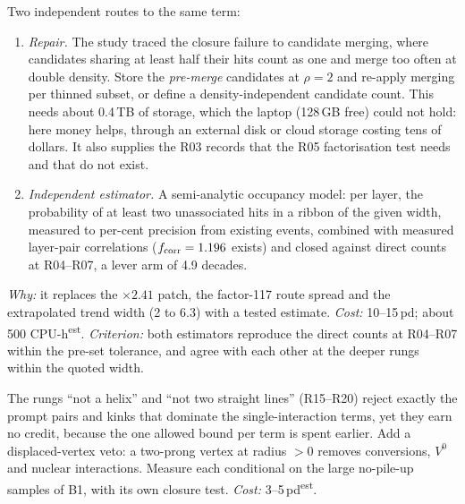 \documentclass[11pt,a4paper]{article}
\newcommand{\EST}{\textsuperscript{\textsf{est}}}
\newcommand{\must}{\textsf{\textbf{Must}}}
\begin{document}
\begin{description}[leftmargin=0pt,style=unboxed]
\item[B2 \must{} Pile-up: repair the thinning closure and add an independent estimator.]
  Two independent routes to the same term:
  \begin{enumerate}
    \item \emph{Repair.} The study traced the closure failure to candidate merging, where candidates sharing at least half
          their hits count as one and merge too often at double density. Store the \emph{pre-merge} candidates at
          $\rho=2$ and re-apply merging per thinned subset, or define a density-independent candidate count. This needs
          about 0.4\,TB of storage, which the laptop (128\,GB free) could not hold: here money helps, through an external
          disk or cloud storage costing tens of dollars. It also supplies the R03 records that the R05 factorisation test
          needs and that do not exist.
    \item \emph{Independent estimator.} A semi-analytic occupancy model: per layer, the probability of at least two
          unassociated hits in a ribbon of the given width, measured to per-cent precision from existing events, combined
          with measured layer-pair correlations ($f_{\rm corr}=1.196$ exists) and closed against direct counts at
          R04--R07, a lever arm of 4.9 decades.
  \end{enumerate}
  \emph{Why:} it replaces the $\times2.41$ patch, the factor-117 route spread and the extrapolated trend width
  (2 to 6.3) with a tested estimate. \emph{Cost:} 10--15\,pd; about 500 CPU-h\EST.
  \emph{Criterion:} both estimators reproduce the direct counts at R04--R07 within the pre-set tolerance, and agree with
  each other at the deeper rungs within the quoted width.

\item[B3 \must{} Let the cuts act on what they were built for.] The rungs ``not a helix'' and ``not two straight lines''
  (R15--R20) reject exactly the prompt pairs and kinks that dominate the single-interaction terms, yet they earn no credit,
  because the one allowed bound per term is spent earlier. Add a displaced-vertex veto: a two-prong vertex at radius
  $>0$ removes conversions, $V^0$ and nuclear interactions. Measure each conditional on the large no-pile-up samples of B1,
  with its own closure test. \emph{Cost:} 3--5\,pd\EST.


\end{description}
\end{document}
